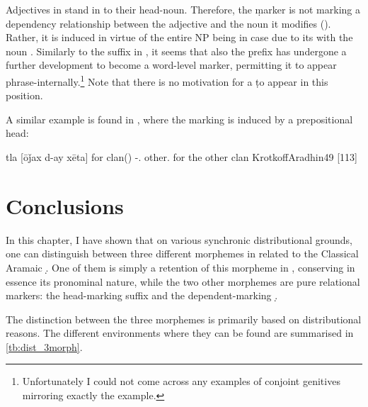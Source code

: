 \largerpage
Adjectives in \Barw stand in  to their head-noun. Therefore, the \d marker is not marking a dependency relationship between the adjective  and the noun it modifies (). Rather, it is induced in virtue of the entire NP being in \gen* case due to its  with the \prim noun . Similarly to the \ed suffix in \Barw, it seems that also the \d prefix has undergone a further development to become  a word-level marker, permitting it to appear phrase-internally.\footnote{Unfortunately I could not come across any examples of conjoint genitives mirroring exactly the \JZax example.} Note that there is no motivation for a \lnk* \d to appear in this position.

A similar example is found in \CArd, where the \gen* marking is induced by a prepositional head:

{tla [ōǰax d-ay xēta]}
{for clan(\fem) \gen-.\fem{} other.\fem}
{for the other clan}
{KrotkoffAradhin}{49 {[113]}}

\section{Conclusions}

In this chapter, I have shown that on various synchronic distributional grounds, one can distinguish between three different morphemes in  related to the Classical Aramaic  \lnk* \d. One of them is simply a retention of this morpheme in , conserving in essence its pronominal nature, while the two other morphemes are pure relational markers: the head-marking \cst* suffix \ed and the dependent-marking \gen* {} \d. 

The distinction between the three morphemes is primarily based on distributional reasons. The different environments where they can be found are summarised in \vref{tb:dist_3morph}.

